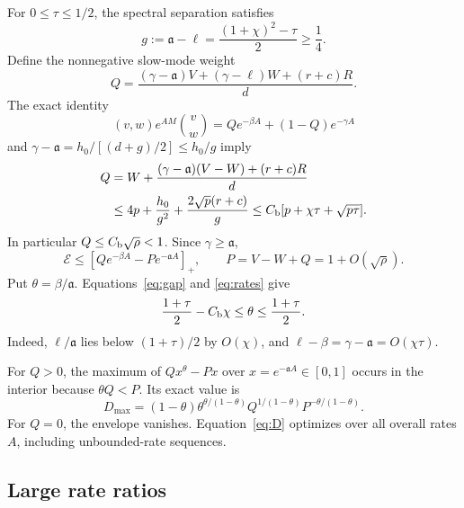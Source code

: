\documentclass[aps,pra,reprint,amsmath,amssymb,nofootinbib,floatfix,longbibliography]{revtex4-2}
\theoremstyle{aps}
\begin{document}
For $0\le\tau\le1/2$, the spectral separation satisfies
\begin{equation}\label{eq:gap}
 g:=\mathfrak a-\ell=\frac{(1+\chi)^2-\tau}{2}\ge\frac14.
\end{equation}
Define the nonnegative slow-mode weight
\begin{equation}\label{eq:Qweight}
 Q=\frac{(\gamma-\mathfrak a)V+(\gamma-\ell)W+(r+c)R}{d}.
\end{equation}
The exact identity
\begin{equation}\label{eq:twoexp}
 (v,w)e^{AM}\binom vw=Qe^{-\beta A}+(1-Q)e^{-\gamma A}
\end{equation}
and $\gamma-\mathfrak a=h_0/[(d+g)/2]\le h_0/g$ imply
\begin{align}
 Q&=W+\frac{(\gamma-\mathfrak a)(V-W)+(r+c)R}{d}\nonumber\\
 &\le4p+\frac{h_0}{g^2}+\frac{2\sqrt p(r+c)}g
 \le C_{\rm b}[p+\chi\tau+\sqrt{p\tau}].\label{eq:Qbound}
\end{align}
In particular $Q\le C_{\rm b}\sqrt\rho<1$. Since $\gamma\ge\mathfrak a$,
\begin{equation}\label{eq:scalarbound}
 \mathcal E\le[Qe^{-\beta A}-Pe^{-\mathfrak a A}]_+,
 \qquad P=V-W+Q=1+O(\sqrt\rho).
\end{equation}
Put $\theta=\beta/\mathfrak a$. Equations~\eqref{eq:gap} and \eqref{eq:rates} give
\begin{equation}\label{eq:theta}
 \frac{1+\tau}{2}-C_{\rm b}\chi\le\theta\le\frac{1+\tau}{2}.
\end{equation}
Indeed, $\ell/\mathfrak a$ lies below $(1+\tau)/2$ by $O(\chi)$, and $\ell-\beta=\gamma-\mathfrak a=O(\chi\tau)$.

For $Q>0$, the maximum of $Qx^\theta-Px$ over $x=e^{-\mathfrak a A}\in[0,1]$ occurs in the interior because $\theta Q<P$. Its exact value is
\begin{equation}\label{eq:D}
 D_{\max}=(1-\theta)\theta^{\theta/(1-\theta)}
 Q^{1/(1-\theta)}P^{-\theta/(1-\theta)}.
\end{equation}
For $Q=0$, the envelope vanishes. Equation~\eqref{eq:D} optimizes over all overall rates $A$, including unbounded-rate sequences.

\subsection{Large rate ratios}
\end{document}
